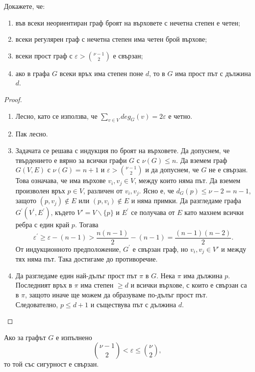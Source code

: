 \begin{problem}
  Докажете, че:
  \begin{enumerate}
  \item
    във всеки неориентиран граф броят на върховете с нечетна степен е четен;
  \item
    всеки регулярен граф с нечетна степен има четен брой върхове;
  \item
    всеки прост граф с $\varepsilon > \binom{\nu-1}{2}$ е свързан;
  \item
    ако в графа $G$ всеки връх има степен поне $d$, то в $G$ има прост път с дължина $d$.
  \end{enumerate}
\end{problem}
\begin{proof}
  \begin{enumerate}
  \item
    Лесно, като се използва, че $\sum_{v\in V} deg_G(v) = 2\varepsilon$ е четно.
  \item
    Пак лесно.
  \item
    Задачата се решава с индукция по броят на върховете.
    Да допуснем, че твърдението е вярно за всички графи $G$ с $\nu(G)\leq n$.
    Да вземем граф $G(V,E)$ с $\nu(G) = n+1$ и $\varepsilon>\binom{\nu-1}{2}$ и да допуснем, че 
    $G$ не е свързан. Това означава, че има върхове $v_i,v_j\in V$, между които няма път.
    Да вземем произволен връх $p\in V$, различен от $v_i,v_j$.
    Ясно е, че $d_G(p) \leq \nu-2 = n-1$, защото $(p,v_j)\not\in E$ или $(p,v_i)\not\in E$ и няма примки.
    Да разгледаме графа $G^\prime(V^\prime,E^\prime)$, където $V' = V\backslash{\{p\}}$ и 
    $E^\prime$ се получава от $E$ като махнем всички ребра с един край $p$.
    Тогава \[\varepsilon^\prime \geq \varepsilon - (n-1) > \frac{n(n-1)}{2} - (n-1) = \frac{(n-1)(n-2)}{2}.\]
    От индукционното предположение, $G^\prime$ е свързан граф, но $v_i,v_j\in V'$ и между тях няма път.
    Така достигаме до противоречие.
  \item
    Да разгледаме един най-дълъг прост път $\pi$ в $G$.
    Нека $\pi$ има дължина $p$. Последният връх в $\pi$ има степен $\geq d$ и всички върхове, 
    с които е свързан са в $\pi$, защото иначе ще можем да образуваме по-дълъг прост път.
    Следователно, $p \leq d+1$ и съществува път с дължина $d$.
  \end{enumerate}
\end{proof}

\begin{remark}
  Ако за графът $G$ е изпълнено \[\binom{\nu-1}{2} < \varepsilon \leq \binom{\nu}{2},\]
  то той със сигурност е свързан.
\end{remark}


